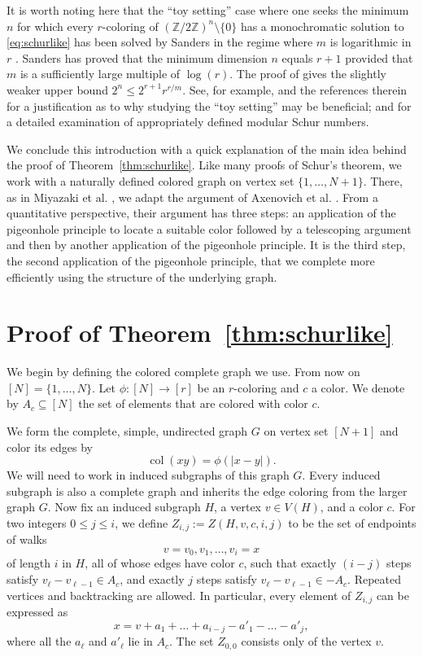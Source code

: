 \documentclass[10pt,a4paper]{amsart}
\newcommand{\Z}{\mathbb{Z}}
\newcommand{\col}{\operatorname{col}}
\begin{document}
It is worth noting here that the ``toy setting'' case where one seeks the minimum $n$ for which every $r$-coloring of $(\Z/2\Z)^n \setminus \{0\}$ has a monochromatic solution to \eqref{eq:schurlike} has been solved by Sanders in the regime where $m$ is logarithmic in $r$ \cite{Sanders-personal}. Sanders has proved that the minimum dimension $n$ equals $r+1$ provided that $m$ is a sufficiently large multiple of $\log(r)$. The proof of \cite[Theorem 1.2]{ACJMR2026} gives the slightly weaker upper bound $2^n \leq 2^{r+1} r^{r/m}$. See, for example, \cite[Section 2]{Sanders2026a} and the references therein for a justification as to why studying the ``toy setting'' may be beneficial; and \cite{Abbott-Hanson1972,Heule2018,Sanders2026b} for a detailed examination of appropriately defined modular Schur numbers. 

We conclude this introduction with a quick explanation of the main idea behind the proof of Theorem~\ref{thm:schurlike}. Like many proofs of Schur's theorem, we work with a naturally defined colored graph on vertex set $\{1,\dots, N+1\}$. There, as in Miyazaki et al. \cite{MMPZ2026}, we adapt the argument of Axenovich et al. \cite{ACJMR2026}. From a quantitative perspective, their argument has three steps: an application of the pigeonhole principle to locate a suitable color followed by a telescoping argument and then by another application of the pigeonhole principle. It is the third step, the second application of the pigeonhole principle, that we complete more efficiently using the structure of the underlying graph.



\section[Proof of Theorem 1]{Proof of Theorem~\ref{thm:schurlike}}

We begin by defining the colored complete graph we use. From now on $[N] = \{1, \dots, N\}$. Let
\(
  \phi:[N]\longrightarrow[r]
\)
be an $r$-coloring and $c$ a color. We denote by  \(A_{c} \subseteq [N]\) the set of elements that are colored with color \(c\).

We form the complete, simple, undirected graph $G$ on vertex set $[N+1]$ and color its edges by
\[
  \col(xy)=\phi(|x-y|).
\]
We will need to work in induced subgraphs of this graph $G$. Every induced subgraph is also a complete graph and inherits the edge coloring from the larger graph $G$. Now fix an induced subgraph \(H\), a vertex \(v \in V(H)\), and a color \(c\). For two integers \(0\leq j\leq i\), we define \(Z_{i,j}:= Z(H,v,c,i,j)\) to be the set of endpoints of walks 
\[
  v=v_0,v_1,\ldots,v_i=x
\] 
of length $i$ in $H$, all of whose edges have color $c$, such that exactly $(i-j)$ steps satisfy $v_\ell-v_{\ell-1}\in A_c$, and exactly $j$ steps satisfy $v_\ell-v_{\ell-1}\in -A_c$. Repeated vertices and backtracking are allowed. In particular, every element of $Z_{i,j}$ can be expressed as
\begin{equation}  
 x=v+a_{1}+\dots+a_{i-j}-a'_{1}-\dots-a'_{j},
\label{eq:charge-rep}
\end{equation}
where all the \(a_\ell\) and \(a'_\ell\) lie in \(A_c\). The set \(Z_{0,0}\) consists only of the vertex \(v\).
\end{document}
